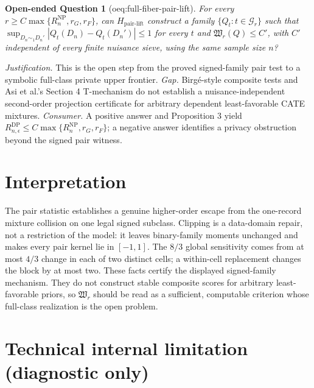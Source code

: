 \documentclass{article}
\newtheorem{openendedquestion}{Open-ended Question}
\begin{document}
\begin{openendedquestion}[oeq:full-fiber-pair-lift]\label{oeq:full-fiber-pair-lift}
For every \(r\ge C\max\{R_n^{\mathrm{NP}},r_G,r_F\}\), can \(H_{\mathrm{pair\mbox{-}lift}}\) construct a family \(\{Q_t:t\in\mathcal G_r\}\) such that \(\sup_{D_n\sim_1D_n'}|Q_t(D_n)-Q_t(D_n')|\le1\) for every \(t\) and \(\mathfrak W_r(Q)\le C'\), with \(C'\) independent of every finite nuisance sieve, using the same sample size \(n\)?
\end{openendedquestion}
\par\smallskip\noindent \textit{Justification.} This is the open step from the proved signed-family pair test to a symbolic full-class private upper frontier. \textit{Gap.} Birgé-style composite tests and Asi et al.'s Section 4 T-mechanism do not establish a nuisance-independent second-order projection certificate for arbitrary dependent least-favorable CATE mixtures. \textit{Consumer.} A positive answer and Proposition 3 yield \(R_{n,\epsilon}^{\mathrm{DP}}\le C\max\{R_n^{\mathrm{NP}},r_G,r_F\}\); a negative answer identifies a privacy obstruction beyond the signed pair witness.

\section{Interpretation}

The pair statistic establishes a genuine higher-order escape from the one-record mixture collision on one legal signed subclass. Clipping is a data-domain repair, not a restriction of the model: it leaves binary-family moments unchanged and makes every pair kernel lie in \([-1,1]\). The \(8/3\) global sensitivity comes from at most \(4/3\) change in each of two distinct cells; a within-cell replacement changes the block by at most two. These facts certify the displayed signed-family mechanism. They do not construct stable composite scores for arbitrary least-favorable priors, so \(\mathfrak W_r\) should be read as a sufficient, computable criterion whose full-class realization is the open problem.

\section*{Technical internal limitation (diagnostic only)}
\end{document}

